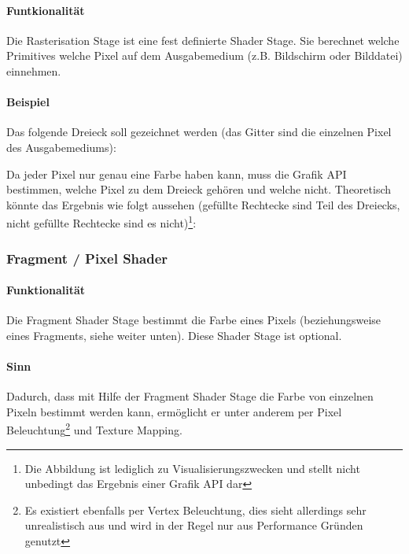 \paragraph{Funtkionalität}
Die Rasterisation Stage ist eine fest definierte Shader Stage. Sie berechnet welche Primitives welche Pixel auf dem Ausgabemedium (z.B. Bildschirm oder Bilddatei) einnehmen.

\paragraph{Beispiel}
Das folgende Dreieck soll gezeichnet werden (das Gitter sind die einzelnen Pixel des Ausgabemediums):

\drawrasterizergfxnotfilled

Da jeder Pixel nur genau eine Farbe haben kann, muss die Grafik API bestimmen, welche Pixel zu dem Dreieck gehören und welche nicht. Theoretisch könnte das Ergebnis wie folgt aussehen (gefüllte Rechtecke sind Teil des Dreiecks, nicht gefüllte Rechtecke sind es nicht)\footnote{Die Abbildung ist lediglich zu Visualisierungszwecken und stellt nicht unbedingt das Ergebnis einer Grafik API dar}:

\drawrasterizergfxfilled

\subsubsection{Fragment / Pixel Shader}
\paragraph{Funktionalität}
Die Fragment Shader Stage bestimmt die Farbe eines Pixels (beziehungsweise eines Fragments, siehe weiter unten). Diese Shader Stage ist optional.

\paragraph{Sinn}
Dadurch, dass mit Hilfe der Fragment Shader Stage die Farbe von einzelnen Pixeln bestimmt werden kann, ermöglicht er unter anderem per Pixel Beleuchtung\footnote{Es existiert ebenfalls per Vertex Beleuchtung, dies sieht allerdings sehr unrealistisch aus und wird in der Regel nur aus Performance Gründen genutzt} und Texture Mapping.

